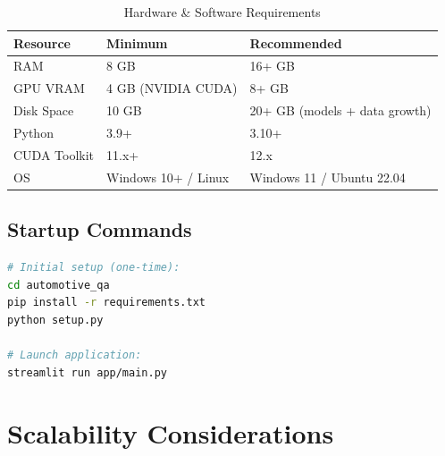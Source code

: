 \documentclass[12pt, a4paper, twoside]{article}
\begin{document}
\begin{table}[H]
\centering
\caption{Hardware \& Software Requirements}
\label{tab:requirements}
\begin{tabularx}{\textwidth}{L{2.5cm} X X}
\toprule
{}\color{white}\textbf{Resource} & \color{white}\textbf{Minimum} & \color{white}\textbf{Recommended} \\
\midrule
RAM & 8 GB & 16+ GB \\
GPU VRAM & 4 GB (NVIDIA CUDA) & 8+ GB \\
Disk Space & 10 GB & 20+ GB (models + data growth) \\
Python & 3.9+ & 3.10+ \\
CUDA Toolkit & 11.x+ & 12.x \\
OS & Windows 10+ / Linux & Windows 11 / Ubuntu 22.04 \\
\bottomrule
\end{tabularx}
\end{table}

\subsection{Startup Commands}

\begin{lstlisting}[language=bash, caption={Application Launch Commands}]
# Initial setup (one-time):
cd automotive_qa
pip install -r requirements.txt
python setup.py

# Launch application:
streamlit run app/main.py
\end{lstlisting}

\newpage

\section{Scalability Considerations}
\end{document}
